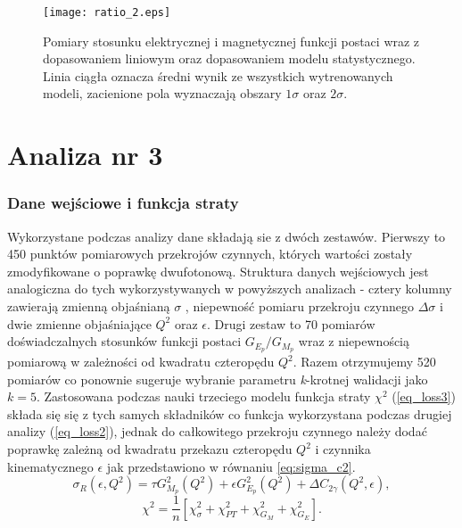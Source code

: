 \documentclass[11pt]{book}
\theoremstyle{definition}
\begin{document}
%
\begin{figure}[hp!]
	\centering
	\texttt{[image: ratio\_2.eps]}
	\caption{Pomiary stosunku elektrycznej i magnetycznej funkcji postaci wraz z dopasowaniem liniowym oraz dopasowaniem modelu statystycznego. Linia ciągła oznacza średni wynik ze wszystkich wytrenowanych modeli, zacienione pola wyznaczają obszary $1 \sigma$ oraz $2\sigma$.} 
	\label{fig:ratio2}
\end{figure}


\newpage
\section{Analiza nr 3}
\subsubsection{Dane wejściowe i funkcja straty}
%
%
Wykorzystane podczas analizy dane składają sie z dwóch zestawów. Pierwszy to 450 punktów pomiarowych przekrojów czynnych, których wartości zostały zmodyfikowane o poprawkę dwufotonową. Struktura danych wejściowych jest analogiczna do tych wykorzystywanych w powyższych analizach - cztery kolumny zawierają zmienną objaśnianą $\sigma$ , niepewność pomiaru przekroju czynnego $\Delta \sigma$ i dwie zmienne objaśniające $Q^2$ oraz $\epsilon$. Drugi zestaw to 70 pomiarów doświadczalnych stosunków funkcji postaci $G_{E_p} / G_{M_p}$ wraz z niepewnością pomiarową w zależności od kwadratu czteropędu $Q^2$. Razem otrzymujemy 520 pomiarów co ponownie sugeruje wybranie parametru \textit{k}-krotnej walidacji jako $k=5$. Zastosowana podczas nauki trzeciego modelu funkcja straty $\chi^2$ (\ref{eq_loss3}) składa się się z tych samych składników co funkcja wykorzystana podczas drugiej analizy (\ref{eq_loss2}), jednak do całkowitego przekroju czynnego należy dodać poprawkę zależną od kwadratu przekazu czteropędu $Q^2$ i czynnika kinematycznego $\epsilon$ jak przedstawiono w równaniu \ref{eq:sigma_c2}.
%
\begin{equation}
\sigma_R(\epsilon, Q^2) =\tau G_{M_p}^2(Q^2) + \epsilon G_{E_p}^2(Q^2) + \Delta C_{2 \gamma} \left(Q^2, \epsilon \right), \label{eq:sigma_c2}
\end{equation}
%
\begin{equation}
\chi^2 = \frac{1}{n} \left[ \chi_{\sigma}^2 + \chi_{PT}^2 + \chi_{G_M}^2  + \chi_{G_E}^2  \right]. \label{eq_loss3}
\end{equation}
\end{document}
